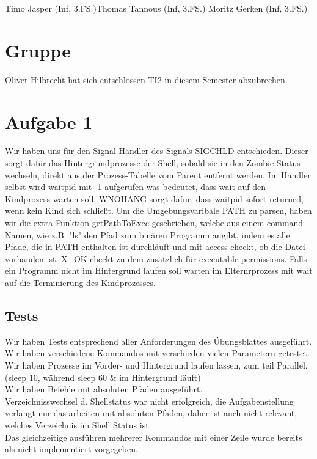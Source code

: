 \documentclass{ti2}
\begin{document}
\lstset{linewidth=\linewidth,breaklines=true}
%
                {Timo Jasper (Inf, 3.FS.)}{Thomas Tannous (Inf, 3.FS.)}%
                {Moritz Gerken (Inf, 3.FS.)}%

\section*{Gruppe}
	Oliver Hilbrecht hat sich entschlossen TI2 in diesem Semester abzubrechen.\\

\section*{Aufgabe 1}


Wir haben uns für den Signal Händler des Signals SIGCHLD entschieden. Dieser sorgt dafür das Hintergrundprozesse der Shell, sobald sie in den Zombie-Status wechseln, direkt aus der Prozess-Tabelle vom Parent entfernt werden.
Im Handler selbst wird waitpid mit  -1 aufgerufen was bedeutet, dass wait auf den Kindprozess warten soll. WNOHANG sorgt dafür, dass waitpid sofort returned, wenn kein Kind sich schließt. 
Um die Umgebungsvaribale PATH zu parsen, haben wir die extra Funktion getPathToExec geschrieben, welche aus einem command Namen, wie z.B. "ls" den Pfad zum binären Programm angibt, indem es alle Pfade, die in PATH enthalten ist durchläuft und mit access checkt, ob die Datei vorhanden ist. X\_OK checkt zu dem zusätzlich für executable permissions. Falls ein Programm nicht im Hintergrund laufen soll warten im Elternrprozess mit wait auf die Terminierung des Kindprozesses.

\subsection*{Tests}



Wir haben Tests entsprechend aller Anforderungen des Übungsblattes ausgeführt.\\
Wir haben verschiedene Kommandos mit verschieden vielen Parametern getestet.\\
Wir haben Prozesse im Vorder- und Hintergrund laufen lassen, zum teil Parallel.(sleep 10, während sleep 60 \& im Hintergrund läuft)\\
Wir haben Befehle mit absoluten Pfaden ausgeführt.\\
Verzeichnisswechsel d. Shellstatus war nicht erfolgreich, die Aufgabenstellung verlangt nur das arbeiten mit absoluten Pfaden, daher ist auch nicht relevant, welches Verzeichnis im Shell Status ist.\\
Das gleichzeitige ausführen mehrerer Kommandos mit einer Zeile wurde bereits als nicht implementiert vorgegeben.\\
\end{document}
